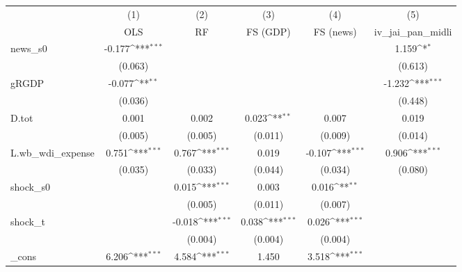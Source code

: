 {
\def\sym#1{\ifmmode^{#1}\else\(^{#1}\)\fi}
\begin{tabular}{l*{5}{c}}
\toprule
            &\multicolumn{1}{c}{(1)}&\multicolumn{1}{c}{(2)}&\multicolumn{1}{c}{(3)}&\multicolumn{1}{c}{(4)}&\multicolumn{1}{c}{(5)}\\
            &\multicolumn{1}{c}{OLS}&\multicolumn{1}{c}{RF}&\multicolumn{1}{c}{FS (GDP)}&\multicolumn{1}{c}{FS (news)}&\multicolumn{1}{c}{iv\_jai\_pan\_midli}\\
\midrule
news\_s0     &      -0.177\sym{***}&                     &                     &                     &       1.159\sym{*}  \\
            &     (0.063)         &                     &                     &                     &     (0.613)         \\
\addlinespace
gRGDP       &      -0.077\sym{**} &                     &                     &                     &      -1.232\sym{***}\\
            &     (0.036)         &                     &                     &                     &     (0.448)         \\
\addlinespace
D.tot       &       0.001         &       0.002         &       0.023\sym{**} &       0.007         &       0.019         \\
            &     (0.005)         &     (0.005)         &     (0.011)         &     (0.009)         &     (0.014)         \\
\addlinespace
L.wb\_wdi\_expense&       0.751\sym{***}&       0.767\sym{***}&       0.019         &      -0.107\sym{***}&       0.906\sym{***}\\
            &     (0.035)         &     (0.033)         &     (0.044)         &     (0.034)         &     (0.080)         \\
\addlinespace
shock\_s0    &                     &       0.015\sym{***}&       0.003         &       0.016\sym{**} &                     \\
            &                     &     (0.005)         &     (0.011)         &     (0.007)         &                     \\
\addlinespace
shock\_t     &                     &      -0.018\sym{***}&       0.038\sym{***}&       0.026\sym{***}&                     \\
            &                     &     (0.004)         &     (0.004)         &     (0.004)         &                     \\
\addlinespace
\_cons      &       6.206\sym{***}&       4.584\sym{***}&       1.450         &       3.518\sym{***}&                     \\

\end{tabular}}
